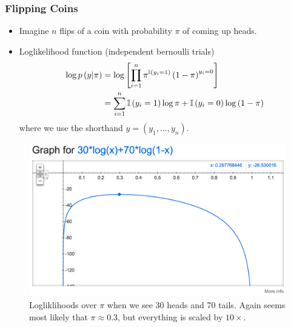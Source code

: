 \documentclass[10pt,mathserif]{beamer}
\begin{document}
\begin{frame}
  \frametitle{Flipping Coins}
  \begin{itemize}
  \item Imagine $n$ flips of a coin with probability $\pi$ of coming up heads.
  \item Loglikelihood function (independent bernoulli trials)
    \begin{align*}
      \log p\left(y \vert \pi \right) &= \log \left[\prod_{i = 1}^{n} \pi^{\mathbb{I}\left({y_i = 1}\right)}\left(1 - \pi\right)^{y_i = 0}\right] \\
      &= \sum_{i = 1}^{n} \mathbb{I}\left({y_i = 1}\right)\log \pi + \mathbb{I}\left({y_i = 0}\right)\log\left(1 - \pi\right)
    \end{align*}
    where we use the shorthand $y = \left(y_1, \dots, y_n\right)$.
  \end{itemize}
  \begin{figure}[ht]
    \centering
    \includegraphics[width=0.3\paperwidth]{figure/loglikelihood_bernoulli_100}
    \caption{Logliklihoods over $\pi$ when we see 30 heads and 70 tails. Again seems
      most likely that $\pi \approx 0.3$, but everything is scaled by $10
      \times$. \label{fig:loglikelihood_bernoulli_100} }
  \end{figure}
\end{frame}

\end{document}
